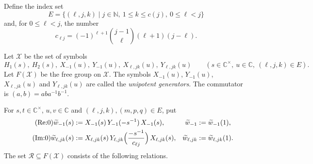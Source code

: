\documentclass[11pt]{article}
\theoremstyle{definition}
\theoremstyle{remark}
\newcommand{\Cx}{\mathbb{C}^{\times}}
\newcommand{\wt}{\widetilde{w}}
\begin{document}
Define the index set
\[
E=\{(\ell,j,k)\mid j\in\mathbb{N},\ 1\le k\le c(j),\ 0\le \ell<j\}
\]
and, for $0\le\ell<j$, the number
\[
c_{\ell j}=(-1)^{\ell+1}\binom{j-1}{\ell}(\ell+1)(j-\ell).
\]

Let $\mathcal{X}$ be the set of symbols
\[
H_1(s),\ H_2(s),\ X_{-1}(u),\ Y_{-1}(u),\ X_{\ell,jk}(u),\ Y_{\ell,jk}(u)
\qquad (s\in\Cx,\ u\in\mathbb{C},\ (\ell,j,k)\in E).
\]
Let $F(\mathcal{X})$ be the free group on $\mathcal{X}$. The symbols $X_{-1}(u)$, $Y_{-1}(u)$, $X_{\ell,jk}(u)$ and $Y_{\ell,jk}(u)$ are called the \emph{unipotent generators}. The commutator is $(a,b)=aba^{-1}b^{-1}$.

For $s,t\in\Cx$, $u,v\in\mathbb{C}$ and $(\ell,j,k),(m,p,q)\in E$, put
\begin{align*}
\tag{Re:0} \wt_{-1}(s)&:=X_{-1}(s)\,Y_{-1}(-s^{-1})\,X_{-1}(s), & \wt_{-1}&:=\wt_{-1}(1),\\
\tag{Im:0} \wt_{\ell,jk}(s)&:=X_{\ell,jk}(s)\,Y_{\ell,jk}\Bigl(\frac{-s^{-1}}{c_{\ell j}}\Bigr)\,X_{\ell,jk}(s), & \wt_{\ell,jk}&:=\wt_{\ell,jk}(1).
\end{align*}
The set $\mathcal{R}\subseteq F(\mathcal{X})$ consists of the following relations.
\end{document}
